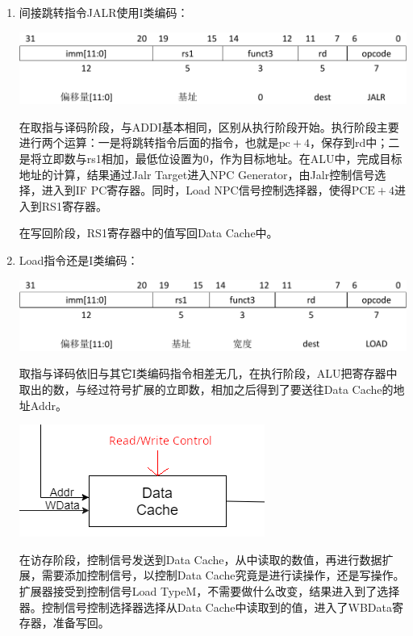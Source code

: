 \documentclass[UTF8,zihao=-4]{ctexart}
\begin{document}
\begin{enumerate}
		\item 间接跳转指令JALR使用I类编码：
		\begin{center}
		\includegraphics[width=0.8\linewidth]{jalr}
		\end{center}
		在取指与译码阶段，与ADDI基本相同，区别从执行阶段开始。执行阶段主要进行两个运算：一是将跳转指令后面的指令，也就是$\text{pc}+4$，保存到rd中；二是将立即数与rs1相加，最低位设置为0，作为目标地址。在ALU中，完成目标地址的计算，结果通过Jalr Target进入NPC Generator，由Jalr控制信号选择，进入到IF PC寄存器。同时，Load NPC信号控制选择器，使得$\text{PCE}+4$进入到RS1寄存器。
		
		在写回阶段，RS1寄存器中的值写回Data Cache中。
		
		\item Load指令还是I类编码：
		\begin{center}
		\includegraphics[width=0.8\linewidth]{load}
		\end{center}
		取指与译码依旧与其它I类编码指令相差无几，在执行阶段，ALU把寄存器中取出的数，与经过符号扩展的立即数，相加之后得到了要送往Data Cache的地址Addr。
		\begin{center}
		\includegraphics[scale=0.5]{data_cache_control_patch}
		\end{center}
		在访存阶段，控制信号发送到Data Cache，从中读取的数值，再进行数据扩展，需要添加控制信号，以控制Data Cache究竟是进行读操作，还是写操作。扩展器接受到控制信号Load TypeM，不需要做什么改变，结果进入到了选择器。控制信号控制选择器选择从Data Cache中读取到的值，进入了WBData寄存器，准备写回。
		

\end{enumerate}
\end{document}
